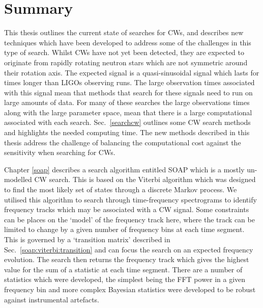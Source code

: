 \chapter{\label{summary}Summary}


This thesis outlines the current state of searches for \glspl{CW}, and describes new techniques which have been developed to address some of the challenges in this type of search.
Whilst \glspl{CW} have not yet been detected, they are expected to originate from rapidly rotating neutron stars which are not symmetric around their rotation axis.
The expected signal is a quasi-sinusoidal signal which lasts for times longer than \glspl{LIGO} observing runs.
The large observation times associated with this signal mean that methods that search for these signals need to run on large amounts of data.
For many of these searches the large observations times along with the large parameter space, mean that there is a large computational associated with each search. 
Sec.~\ref{searchcw} outlines some \gls{CW} search methods and highlights the needed computing time.
The new methods described in this thesis address the challenge of balancing the computational cost against the sensitivity when searching for \glspl{CW}.

\bigskip

Chapter \ref{soap} describes a search algorithm entitled SOAP which is a mostly un-modelled \gls{CW} search. 
This is based on the Viterbi algorithm which was designed to find the most likely set of states through a discrete Markov process.
We utilised this algorithm to search through time-frequency spectrograms to identify frequency tracks which may be associated with a \gls{CW} signal.
Some constraints can be places on the `model' of the frequency track here, where the track can be limited to change by a given number of frequency bins at each time segment. 
This is governed by a `transition matrix' described in Sec.~\ref{soap:viterbi:transition} and can focus the search on an expected frequency evolution.
The search then returns the frequency track which gives the highest value for the sum of a statistic at each time segment.
There are a number of statistics which were developed, the simplest being the \gls{FFT} power in a given frequency bin and more complex Bayesian statistics were developed to be robust against instrumental artefacts.

